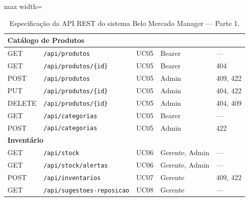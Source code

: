 \begin{table}[H]
\begin{adjustbox}{max width=\textwidth}
\begin{tabular}{|p{1.4cm}|p{5cm}|p{1.2cm}|p{2.3cm}|p{2.2cm}|}
\multicolumn{5}{|l|}{\cellcolor{gray!15}\textbf{Catálogo de Produtos}} \\
\hline
GET & \texttt{/api/produtos} & UC05 & Bearer & --- \\
\hline
GET & \texttt{/api/produtos/\{id\}} & UC05 & Bearer & 404 \\
\hline
POST & \texttt{/api/produtos} & UC05 & Admin & 409, 422 \\
\hline
PUT & \texttt{/api/produtos/\{id\}} & UC05 & Admin & 404, 422 \\
\hline
DELETE & \texttt{/api/produtos/\{id\}} & UC05 & Admin & 404, 409 \\
\hline
GET & \texttt{/api/categorias} & UC05 & Bearer & --- \\
\hline
POST & \texttt{/api/categorias} & UC05 & Admin & 422 \\
\hline

\multicolumn{5}{|l|}{\cellcolor{gray!15}\textbf{Inventário}} \\
\hline
GET & \texttt{/api/stock} & UC06 & Gerente, Admin & --- \\
\hline
GET & \texttt{/api/stock/alertas} & UC06 & Gerente, Admin & --- \\
\hline
POST & \texttt{/api/inventarios} & UC07 & Gerente & 409, 422 \\
\hline
GET & \texttt{/api/sugestoes-reposicao} & UC08 & Gerente & --- \\
\hline

\end{tabular}
\end{adjustbox}
\caption{Especificação da API REST do sistema Belo Mercado Manager — Parte 1.}
\label{tab:api-completa-parte1}
\end{table}

